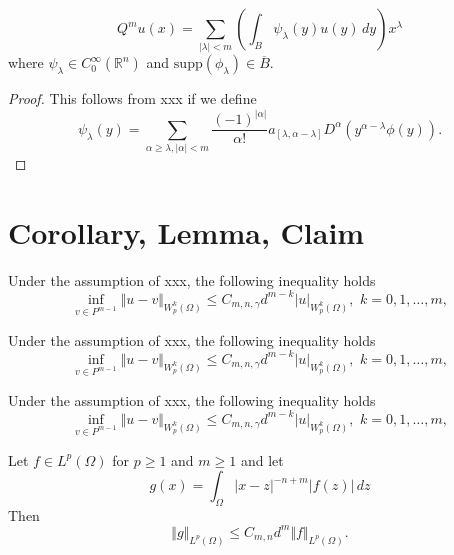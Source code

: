 \documentclass{article}
\begin{document}
\begin{proposition*}
    \begin{equation*}
        Q^m u(x) = \sum_{|\lambda| < m} \left( \int_B \psi_\lambda(y) u(y)\,dy \right) x^\lambda
    \end{equation*}
    where $\psi_\lambda \in C_0^\infty(\mathbb{R}^n)$ and $\mathrm{supp}(\phi_\lambda) \in \overline{B}$.
\end{proposition*}
\begin{proof}
    This follows from xxx if we define
    \begin{equation*}
        \psi_\lambda(y) = \sum_{\alpha \ge \lambda,|\alpha|<m}
        \frac{(-1)^{|\alpha|}}{\alpha !} a_{[\lambda,\alpha-\lambda]} D^\alpha(y^{\alpha-\lambda} \phi(y)).
    \end{equation*}
\end{proof}

\section{Corollary, Lemma, Claim}

\begin{corollary}
    Under the assumption of xxx, the following inequality holds
    \begin{equation*}
        \inf_{v \in P^{m-1}} \Vert u - v \Vert_{W^k_p(\Omega)} \le C_{m,n,\gamma} d^{m-k} |u|_{W^k_p(\Omega)}, \,\, k = 0,1,\dots,m,
    \end{equation*}
\end{corollary}

\begin{corollary}[xxx]
    Under the assumption of xxx, the following inequality holds
    \begin{equation*}
        \inf_{v \in P^{m-1}} \Vert u - v \Vert_{W^k_p(\Omega)} \le C_{m,n,\gamma} d^{m-k} |u|_{W^k_p(\Omega)}, \,\, k = 0,1,\dots,m,
    \end{equation*}
\end{corollary}

\begin{corollary*}
    Under the assumption of xxx, the following inequality holds
    \begin{equation*}
        \inf_{v \in P^{m-1}} \Vert u - v \Vert_{W^k_p(\Omega)} \le C_{m,n,\gamma} d^{m-k} |u|_{W^k_p(\Omega)}, \,\, k = 0,1,\dots,m,
    \end{equation*}
\end{corollary*}

\begin{lemma}
    Let $f \in L^p(\Omega)$ for $p \ge 1$ and $m \ge 1$ and let
    \[
        g(x) = \int_\Omega |x-z|^{-n+m} |f(z)|\,dz
    \]
    Then
    \begin{equation*}
        \Vert g \Vert_{L^p(\Omega)} \le C_{m,n} d^m \Vert f\Vert_{L^p(\Omega)}.
    \end{equation*}
\end{lemma}
\end{document}
